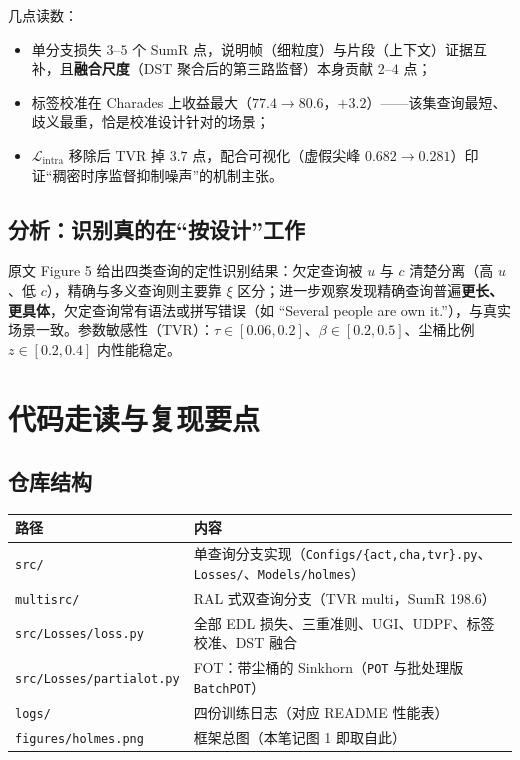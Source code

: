 \documentclass[11pt,a4paper,UTF8,fontset=windows]{ctexart}
\newcommand{\code}[1]{\texttt{#1}}
\newcommand{\term}[1]{\textbf{#1}}
\begin{document}
几点读数：
\begin{itemize}[itemsep=1pt,topsep=2pt]
  \item 单分支损失 $3$--$5$ 个 SumR 点，说明帧（细粒度）与片段（上下文）证据互补，且\term{融合尺度}（DST 聚合后的第三路监督）本身贡献 $2$--$4$ 点；
  \item 标签校准在 Charades 上收益最大（$77.4\to 80.6$，$+3.2$）——该集查询最短、歧义最重，恰是校准设计针对的场景；
  \item $\mathcal{L}_{\mathrm{intra}}$ 移除后 TVR 掉 $3.7$ 点，配合可视化（虚假尖峰 $0.682\to0.281$）印证“稠密时序监督抑制噪声”的机制主张。
\end{itemize}

\subsection{分析：识别真的在“按设计”工作}

原文 Figure 5 给出四类查询的定性识别结果：欠定查询被 $u$ 与 $c$ 清楚分离（高 $u$、低 $c$），精确与多义查询则主要靠 $\xi$ 区分；进一步观察发现精确查询普遍\term{更长、更具体}，欠定查询常有语法或拼写错误（如 “Several people are own it.”），与真实场景一致。参数敏感性（TVR）：$\tau\in[0.06,0.2]$、$\beta\in[0.2,0.5]$、尘桶比例 $z\in[0.2,0.4]$ 内性能稳定。

\section{代码走读与复现要点}

\subsection{仓库结构}

\begin{table}[h]
\centering
\small
\begin{tabular}{@{}ll@{}}
\toprule
路径 & 内容 \\
\midrule
\code{src/} & 单查询分支实现（\code{Configs/\{act,cha,tvr\}.py}、\code{Losses/}、\code{Models/holmes}） \\
\code{multisrc/} & RAL 式双查询分支（TVR multi，SumR 198.6） \\
\code{src/Losses/loss.py} & 全部 EDL 损失、三重准则、UGI、UDPF、标签校准、DST 融合 \\
\code{src/Losses/partialot.py} & FOT：带尘桶的 Sinkhorn（\code{POT} 与批处理版 \code{BatchPOT}） \\
\code{logs/} & 四份训练日志（对应 README 性能表） \\
\code{figures/holmes.png} & 框架总图（本笔记图 1 即取自此） \\
\bottomrule
\end{tabular}
\end{table}
\end{document}

